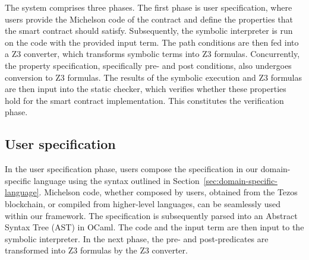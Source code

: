 \documentclass[a4paper,USenglish,cleveref, autoref, thm-restate]{lipics-v2021}
\begin{document}
The system comprises three phases. The first phase is user specification, where users
provide the Michelson code of the contract and define the properties
that the smart contract should satisfy. Subsequently, the symbolic
interpreter is run on the code with the provided input term.  The
path conditions are then fed into a Z3 converter, which transforms
symbolic terms into Z3 formulas. Concurrently, the property
specification, specifically pre- and post conditions, also undergoes
conversion to Z3 formulas. The results of the symbolic execution and
Z3 formulas are then input into the static checker, which verifies
whether these properties hold for the smart contract
implementation. This constitutes the verification phase. 

\subsection{User specification}
\label{sec:user-specification}

In the user specification phase, users compose the specification in
our domain-specific language using the syntax outlined in
Section~\ref{sec:domain-specific-language}. Michelson code, whether
composed by users, obtained from the Tezos blockchain, or compiled
from higher-level languages, can be seamlessly used within our
framework. The specification is subsequently parsed into an Abstract
Syntax Tree (AST) in OCaml. The code and the input term are then
input to the symbolic interpreter. In the next phase, the pre- and
post-predicates are transformed into Z3 formulas by the Z3 converter.
\end{document}

